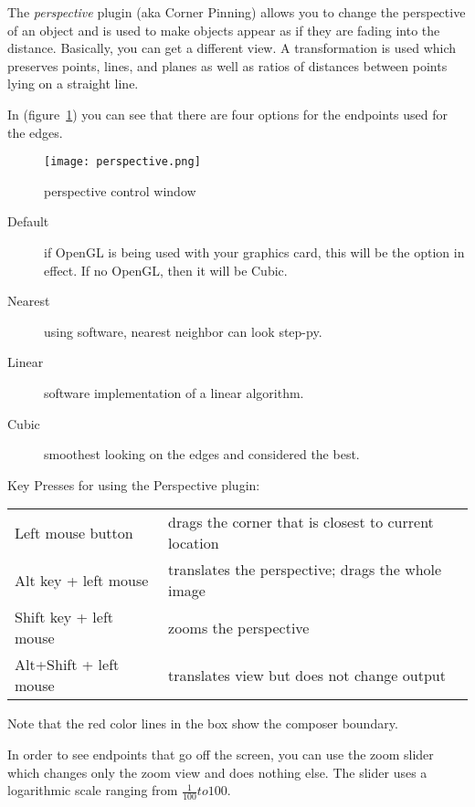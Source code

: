 The \textit{perspective} plugin (aka Corner Pinning) allows you to change the perspective of an object and is used to make objects appear as if they are fading into the distance. Basically, you can get a different view. A transformation is used which preserves points, lines, and planes as well as ratios of distances between points lying on a straight line.

In (figure~\ref{fig:perspective}) you can see that there are four options for the endpoints used for the edges.

\begin{figure}[htpb]
    \centering
    \texttt{[image: perspective.png]}
    \caption{perspective control window}
    \label{fig:perspective}
\end{figure}

\begin{description}
    \item[Default] if OpenGL is being used with your graphics card, this will be the option in effect. If no OpenGL, then it will be Cubic.
    \item[Nearest] using software, nearest neighbor can look step-py.
    \item[Linear] software implementation of a linear algorithm.
    \item[Cubic] smoothest looking on the
    edges and considered the best.
\end{description}

Key Presses for using the Perspective plugin:

\begin{tabular}{l l}
    \toprule
    Left mouse button & drags the corner that is closest to current location \\
    Alt key + left mouse & translates the perspective; drags the whole image \\
    Shift key + left mouse & zooms the perspective \\
    Alt+Shift + left mouse & translates view but does not change output \\
    \bottomrule
\end{tabular}

Note that the red color lines in the box show the composer boundary.

In order to see endpoints that go off the screen, you can use the zoom slider which changes only the zoom view and does nothing else. The slider uses a logarithmic scale ranging from $\frac{1}{100} to 100$.

